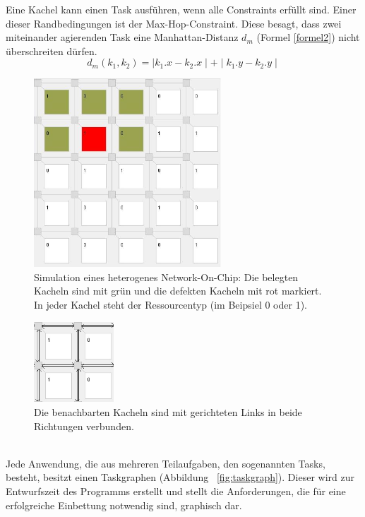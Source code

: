 Eine Kachel kann einen Task ausführen, wenn alle Constraints erfüllt sind. Einer dieser Randbedingungen ist der Max-Hop-Constraint. Diese besagt, dass zwei miteinander agierenden Task eine Manhattan-Distanz  $d_m$ (Formel \ref{formel2}) nicht überschreiten dürfen. 
\begin{equation}
d_m (k_1,k_2) = \mid k_1.x - k_2.x \mid + \mid k_1.y - k_2.y \mid 
\label{formel2}
\end{equation}

\begin{figure}[H]\centering
\includegraphics[width = 70mm]{bilder/NoC.jpg}
\caption{Simulation eines heterogenes Network-On-Chip: Die belegten Kacheln sind mit grün und die defekten Kacheln mit rot markiert. In jeder Kachel steht der Ressourcentyp (im Beipsiel 0 oder 1).}\label{fig:nocbild}
\end{figure}

\begin{figure}[H]\centering
  \includegraphics[width = 30mm]{bilder/Links.jpg}
  \caption{Die benachbarten Kacheln sind mit gerichteten Links in beide Richtungen verbunden.}\label{fig:links}
\end{figure}
\ \\
Jede Anwendung, die aus mehreren Teilaufgaben, den sogenannten Tasks, besteht, besitzt einen Taskgraphen (Abbildung ~\ref{fig:taskgraph}). Dieser wird zur Entwurfszeit des Programms erstellt und stellt die Anforderungen, die für eine erfolgreiche Einbettung notwendig sind, graphisch dar.

